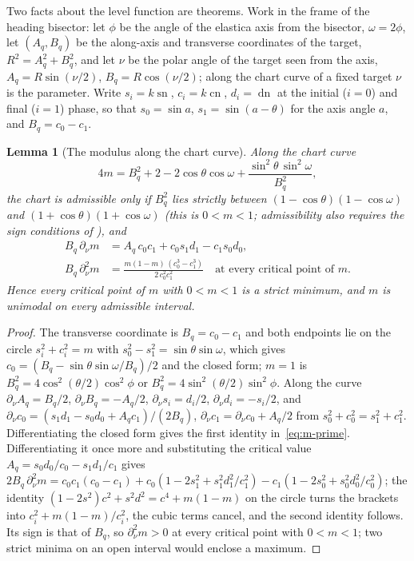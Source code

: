\documentclass[11pt]{article}
\newtheorem{lemma}[theorem]{Lemma}
\theoremstyle{remark}
\newcommand{\sn}{\operatorname{sn}}
\newcommand{\cn}{\operatorname{cn}}
\newcommand{\dn}{\operatorname{dn}}
\begin{document}
Two facts about the level function are theorems.  Work in the frame of
the heading bisector: let $\phi$ be the angle of the elastica axis from
the bisector, $\omega=2\phi$, let $(A_q,B_q)$ be the along-axis and
transverse coordinates of the target, $R^2=A_q^2+B_q^2$, and let $\nu$ be
the polar angle of the target seen from the axis, $A_q=R\sin(\nu/2)$,
$B_q=R\cos(\nu/2)$; along the chart curve of a fixed target $\nu$ is the
parameter.  Write $s_i=k\sn$, $c_i=k\cn$,
$d_i=\dn$ at the initial ($i=0$) and final ($i=1$) phase, so
that $s_0=\sin a$, $s_1=\sin(a-\theta)$ for the axis angle $a$, and
$B_q=c_0-c_1$.

\begin{lemma}[The modulus along the chart curve]\label{lem:modulus}
Along the chart curve
\[
 4m=B_q^2+2-2\cos\theta\cos\omega+\frac{\sin^2\theta\,\sin^2\omega}{B_q^2},
\]
the chart is admissible only if $B_q^2$ lies strictly between
$(1-\cos\theta)(1-\cos\omega)$ and $(1+\cos\theta)(1+\cos\omega)$ (this is
$0<m<1$; admissibility also requires the sign conditions of
\cite[Section~2]{SE2Counts}), and
\begin{equation}\label{eq:m-prime}
\begin{aligned}
 B_q\,\partial_\nu m&=A_q\,c_0c_1+c_0s_1d_1-c_1s_0d_0,\\
 B_q\,\partial_\nu^2 m&=\frac{m(1-m)\,(c_0^3-c_1^3)}{2\,c_0^2c_1^2}
 \quad\text{at every critical point of } m .
\end{aligned}
\end{equation}
Hence every critical point of $m$ with $0<m<1$ is a strict minimum, and
$m$ is unimodal on every admissible interval.
\end{lemma}
\begin{proof}
The transverse coordinate is $B_q=c_0-c_1$ and both endpoints lie on the
circle $s_i^2+c_i^2=m$ with $s_0^2-s_1^2=\sin\theta\sin\omega$, which
gives $c_0=(B_q-\sin\theta\sin\omega/B_q)/2$ and the closed form; $m=1$ is
$B_q^2=4\cos^2(\theta/2)\cos^2\phi$ or $B_q^2=4\sin^2(\theta/2)\sin^2\phi$.
Along the curve $\partial_\nu A_q=B_q/2$, $\partial_\nu B_q=-A_q/2$,
$\partial_\nu s_i=d_i/2$, $\partial_\nu d_i=-s_i/2$, and
$\partial_\nu c_0=(s_1d_1-s_0d_0+A_qc_1)/(2B_q)$,
$\partial_\nu c_1=\partial_\nu c_0+A_q/2$ from $s_0^2+c_0^2=s_1^2+c_1^2$.
Differentiating the closed form gives the first identity
in~\eqref{eq:m-prime}.  Differentiating it once more and substituting
the critical value $A_q=s_0d_0/c_0-s_1d_1/c_1$ gives
$2B_q\,\partial_\nu^2m=c_0c_1(c_0-c_1)+c_0(1-2s_1^2+s_1^2d_1^2/c_1^2)
-c_1(1-2s_0^2+s_0^2d_0^2/c_0^2)$; the identity
$(1-2s^2)c^2+s^2d^2=c^4+m(1-m)$ on the circle turns the brackets into
$c_i^2+m(1-m)/c_i^2$, the cubic terms cancel, and the second identity
follows.  Its sign is that of $B_q$, so $\partial_\nu^2m>0$ at every
critical point with $0<m<1$; two strict minima on an open interval would
enclose a maximum.
\end{proof}
\end{document}
